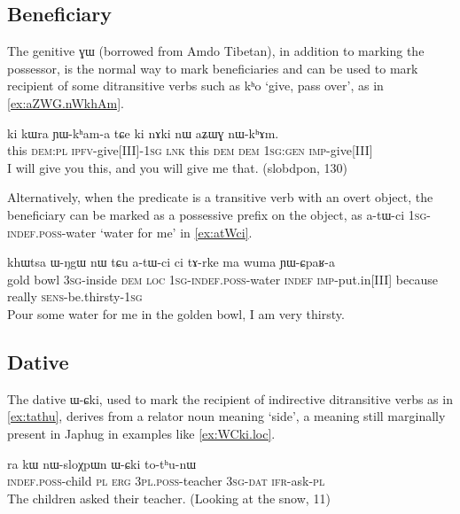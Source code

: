 \documentclass[oldfontcommands,oneside,a4paper,11pt]{article}
\newcommand{\ipa}[1]{{\phon #1}} %
\begin{document}
 

 
 \subsection{Beneficiary}  \label{sec:benef}
The genitive \ipa{ɣɯ} (borrowed from Amdo Tibetan), in addition to marking the possessor, is the normal way to mark beneficiaries and can be used to mark recipient of some ditransitive verbs such as \ipa{kʰo} `give, pass over', as in \ref{ex:aZWG.nWkhAm}.

\begin{exe}
\ex \label{ex:aZWG.nWkhAm}
\gll
\ipa{ki} 	\ipa{kɯra} 	\ipa{ɲɯ-kʰam-a} 	\ipa{tɕe} 	\ipa{ki} 	\ipa{nɤki} 	\ipa{nɯ} 	\ipa{aʑɯɣ} 	\ipa{nɯ-kʰɤm.} \\
this \textsc{dem:pl} \textsc{ipfv}-give[III]-\textsc{1sg} \textsc{lnk} this \textsc{dem} \textsc{dem} \textsc{1sg:gen} \textsc{imp}-give[III] \\
\glt I will give you this, and you will give me that. (slobdpon, 130)
\end{exe}

Alternatively, when the predicate is a transitive verb with an overt object, the beneficiary can be marked as a possessive prefix on the object, as 	\ipa{a-tɯ-ci} \textsc{1sg-indef.poss}-water `water for me' in \ref{ex:atWci}.

\begin{exe}
\ex \label{ex:atWci}
\gll \ipa{χsɤr}  	\ipa{khɯtsa}  	\ipa{ɯ-ŋgɯ}  	\ipa{nɯ}  	\ipa{tɕu}  	\ipa{a-tɯ-ci}  	\ipa{ci}  	\ipa{tɤ-rke}  	\ipa{ma}  	\ipa{wuma}  	\ipa{ɲɯ-ɕpaʁ-a}  \\
gold bowl \textsc{3sg}-inside \textsc{dem} \textsc{loc} \textsc{1sg-indef.poss}-water \textsc{indef} \textsc{imp}-put.in[III] because really \textsc{sens}-be.thirsty-\textsc{1sg} \\
\glt Pour some water for me in the golden bowl, I am very thirsty.
\end{exe}

\subsection{Dative}  \label{sec:dat}
The dative \ipa{ɯ-ɕki}, used to mark the recipient of indirective ditransitive verbs as in \ref{ex:tathu}, derives from a relator noun  meaning `side', a meaning still marginally present in Japhug in examples like \ref{ex:WCki.loc}.

 \begin{exe}
   \ex   \label{ex:tathu}
 \gll \ipa{tɤ-pɤtso}  	\ipa{ra}  	\ipa{kɯ}  	\ipa{nɯ-sloχpɯn}  	\ipa{ɯ-ɕki}  	\ipa{to-tʰu-nɯ}  \\
\textsc{indef.poss}-child \textsc{pl} \textsc{erg} \textsc{3pl.poss}-teacher \textsc{3sg-dat} \textsc{ifr}-ask-\textsc{pl} \\
\glt The children asked their teacher. (Looking at the snow, 11)
   \end{exe}  
\end{document}
